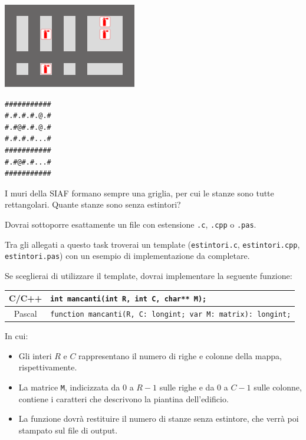 \begin{multicols}{2}
\hspace{1.0cm} \includegraphics[width=0.85\linewidth]{map.png}

\begin{center}
{
\fontsize{1.0cm}{0.01em}
\begin{verbatim}
###########
#.#.#.#.@.#
#.#@#.#.@.#
#.#.#.#...#
###########
#.#@#.#...#
###########
\end{verbatim}
}
\end{center}

\end{multicols}

I muri della SIAF formano sempre una griglia, per cui le stanze sono tutte rettangolari. Quante stanze sono senza estintori?

\Implementation
Dovrai sottoporre esattamente un file con estensione \texttt{.c}, \texttt{.cpp} o \texttt{.pas}.

\begin{warning}
Tra gli allegati a questo task troverai un template (\texttt{estintori.c}, \texttt{estintori.cpp}, \texttt{estintori.pas}) con un esempio di implementazione da completare.
\end{warning}

Se sceglierai di utilizzare il template, dovrai implementare la seguente funzione:
\begin{center}\begin{tabularx}{\textwidth}{|c|X|}
\hline
C/C++  & \verb|int mancanti(int R, int C, char** M);|\\
\hline
Pascal & \verb|function mancanti(R, C: longint; var M: matrix): longint;|\\
\hline
\end{tabularx}\end{center}
In cui:
\begin{itemize}[nolistsep]
  \item Gli interi $R$ e $C$ rappresentano il numero di righe e colonne della mappa, rispettivamente.
  \item La matrice \texttt{M}, indicizzata da $0$ a $R-1$ sulle righe e da $0$ a $C-1$ sulle colonne, contiene i caratteri che descrivono la piantina dell'edificio.
  \item La funzione dovrà restituire il numero di stanze senza estintore, che verrà poi stampato sul file di output.
\end{itemize}

